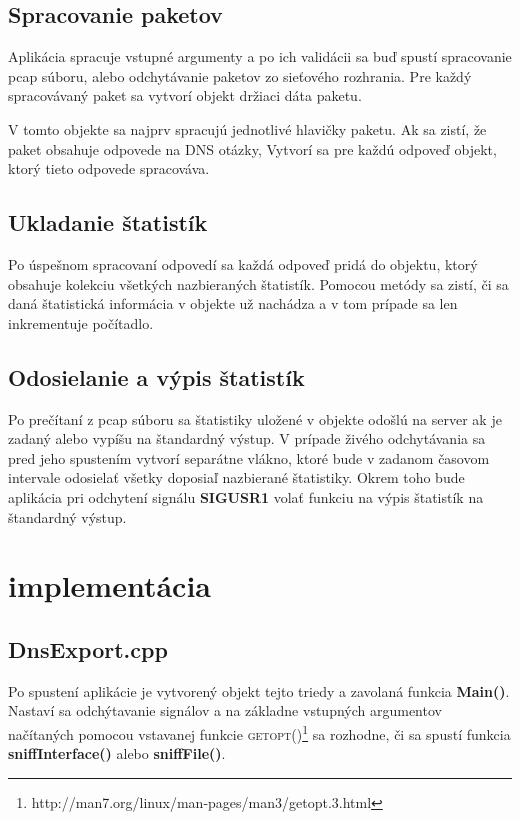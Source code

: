 \documentclass{article}
\begin{document}
        \subsection{Spracovanie paketov}
        Aplikácia spracuje vstupné argumenty a po ich validácii sa buď spustí spracovanie pcap súboru, alebo odchytávanie
        paketov zo sieťového rozhrania. Pre každý spracovávaný paket sa vytvorí objekt držiaci dáta paketu.

        V tomto objekte sa najprv spracujú jednotlivé hlavičky paketu. Ak sa zistí, že paket obsahuje odpovede na DNS otázky,
        Vytvorí sa pre každú odpoveď objekt, ktorý tieto odpovede spracováva.

        \subsection{Ukladanie štatistík}
        Po úspešnom spracovaní odpovedí sa každá odpoveď pridá do objektu, ktorý obsahuje kolekciu všetkých nazbieraných štatistík.
        Pomocou metódy sa zistí, či sa daná štatistická informácia v objekte už nachádza a v tom prípade sa len inkrementuje počítadlo.
        
        \subsection{Odosielanie a výpis štatistík}
        Po prečítaní z pcap súboru sa štatistiky uložené v objekte odošlú na server ak je zadaný alebo vypíšu na štandardný výstup.
        V prípade živého odchytávania sa pred jeho spustením vytvorí separátne vlákno, ktoré bude v zadanom časovom intervale
        odosielať všetky doposiaľ nazbierané štatistiky. Okrem toho bude aplikácia pri odchytení signálu \textbf{SIGUSR1} volať funkciu
        na výpis štatistík na štandardný výstup.
        
    \section{implementácia}
    
        \subsection{DnsExport.cpp}
        Po spustení aplikácie je vytvorený objekt tejto triedy a zavolaná funkcia \textbf{Main()}. Nastaví sa odchýtavanie signálov
        a na základne vstupných argumentov načítaných pomocou vstavanej funkcie \textsc{getopt()}\footnote{http://man7.org/linux/man-pages/man3/getopt.3.html} sa rozhodne, či sa spustí funkcia
        \textbf{sniffInterface()} alebo \textbf{sniffFile()}. 
        
\end{document}
